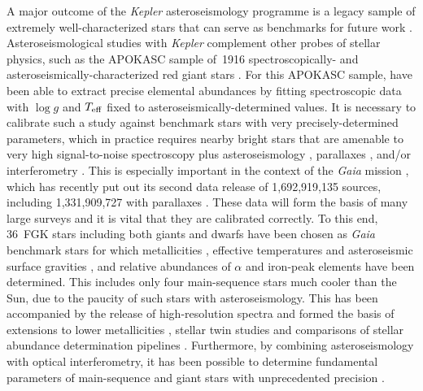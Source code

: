 \documentclass[modern]{aastex62}
\newcommand{\teff}{\mbox{$T_{\rm eff}$}\xspace}
\newcommand{\logg}{\mbox{$\log g$}\xspace}
\newcommand{\kepler}{\textit{Kepler}\xspace}
\newcommand{\gaia}{\textit{Gaia}\xspace}
\begin{document}
A major outcome of the \kepler asteroseismology programme is a legacy sample of extremely well-characterized stars that can serve as benchmarks for future work \citep{keplerlegacy1,silvaaguirre2017,silvaaguirre2015,2016MNRAS.456.2183D}. Asteroseismological studies with \kepler complement other probes of stellar physics, such as the APOKASC sample of~1916 spectroscopically- and asteroseismically-characterized red giant stars \citep{2014ApJS..215...19P}. For this APOKASC sample, \citet{hawkinsapogee} have been able to extract precise elemental abundances by fitting spectroscopic data with \logg and \teff fixed to asteroseismically-determined values. It is necessary to calibrate such a study against benchmark stars with very precisely-determined parameters, which in practice requires nearby bright stars that are amenable to very high signal-to-noise spectroscopy plus asteroseismology \citep{creeveybenchmark}, parallaxes \citep{hawkinsbenchmarks}, and/or interferometry \citep{casagrandebenchmark,creeveybenchmark2}. This is especially important in the context of the \gaia mission \citep{gaia}, which has recently put out its second data release of 1,692,919,135 sources, including 1,331,909,727 with parallaxes \citep{gaiadr2}. These data will form the basis of many large surveys and it is vital that they are calibrated correctly. To this end, 36~FGK stars including both giants and dwarfs have been chosen as \gaia benchmark stars for which metallicities \citep{gaiabenchmark1,2018RNAAS...2c.152J}, effective temperatures and asteroseismic surface gravities \citep{gaiabenchmark3}, and relative abundances of $\alpha$ and iron-peak elements \citep{gaiabenchmark4} have been determined. This includes only four main-sequence stars much cooler than the Sun, due to the paucity of such stars with asteroseismology. This has been accompanied by the release of high-resolution spectra \citep{gaiabenchmark2} and formed the basis of extensions to lower metallicities \citep{gaiabenchmark5}, stellar twin studies \citep{gaiabenchmarktwins} and comparisons of stellar abundance determination pipelines \citep{gaiabenchmarkabundances}. Furthermore, by combining asteroseismology with optical interferometry, it has been possible to determine fundamental parameters of main-sequence and giant stars with unprecedented precision \citep{huber12,thetacygwhite,white15}. 
\end{document}
